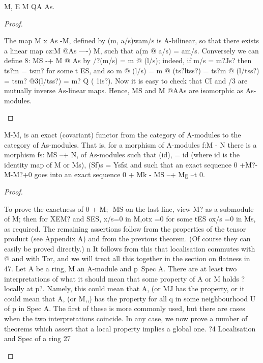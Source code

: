 \begin{theorem}[Theorem 4.4]\label{mcrt-auto-theorem-4-4}\uses{}
\begin{mathematicalrecord}
M, E M QA As.
\end{mathematicalrecord}
\end{theorem}
\begin{proof}
\begin{mathematicalrecord}
The map M x As -M,             defined by (m, a/s)wam/s      is A-bilinear,
so that there exists a linear map cz:M @As ----) M, such that a(m @ a/s) =
am/s. Conversely we can define 8: MS -+ M @ As by /?(m/s) = m @ (l/s);
indeed, if m/s = m?Js? then ts?m = tsm? for some t ES, and so
         m @ (l/s) = m @ (ts?ltss?) = ts?m @ (l/tss?) = tsm? @3(l/tss?)
                   = m? Q ( 1is?).
Now it is easy to check that CI and /3 are mutually inverse As-linear
maps. Hence, MS and M @AAs are isomorphic as As-modules.
\end{mathematicalrecord}
\end{proof}


\begin{theorem}[Theorem 4.5]\label{mcrt-auto-theorem-4-5}\uses{}
\begin{mathematicalrecord}
M-M,        is an exact (covariant) functor from the category
of A-modules to the category of As-modules. That is, for a morphism of
A-modules f:M - N there is a morphism fs: MS --+ N, of As-modules
such that
         (id), = id (where id is the identity map of M or Ms),
         (Sf)s = Ysfsi
 and such that an exact sequence 0 +M?-M-M?+0                   goes into an
exact sequence 0 + Mk - MS --+ Mg --t 0.
\end{mathematicalrecord}
\end{theorem}
\begin{proof}
\begin{mathematicalrecord}
To prove the exactness of 0 + M; -MS       on the last line, view M?
 as a submodule of M; then for XEM? and SES,
            x/s=0 in M,otx     =0 for some tES
                          ox/s =0 in Ms,
as required. The remaining assertions follow from the properties of the
 tensor product (see Appendix A) and from the previous theorem. (Of
course they can easily be proved directly.)    n
    It follows from this that localisation commutes with @ and with Tor,
and we will treat all this together in the section on flatness in 47.
    Let A be a ring, M an A-module and p~Spec A. There are at least
two interpretations of what it should mean that some property of A or M
holds ?locally at p?. Namely, this could mean that A, (or MJ has the
property, or it could mean that A, (or M,,) has the property for all q in
some neighbourhood U of p in Spec A. The first of these is more commonly
used, but there are cases when the two interpretations coincide. In any
case, we now prove a number of theorems which assert that a local property
implies a global one.
?4      Localisation   and Spec of a ring                                27
\end{mathematicalrecord}
\end{proof}


